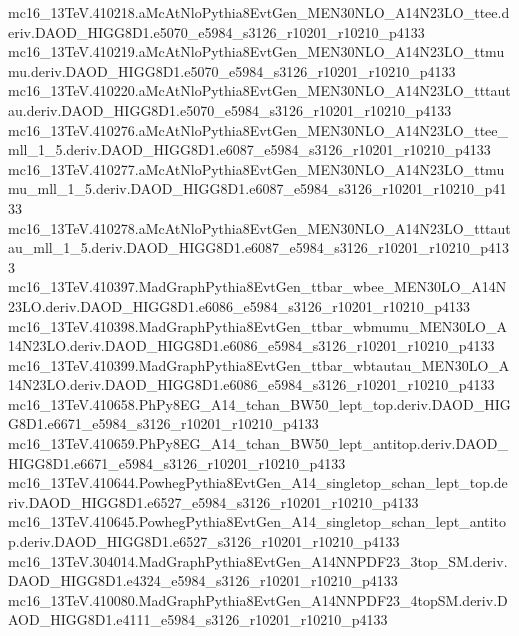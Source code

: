\begin{footnotesize}
mc16\_13TeV.410218.aMcAtNloPythia8EvtGen\_MEN30NLO\_A14N23LO\_ttee.deriv.DAOD\_HIGG8D1.e5070\_e5984\_s3126\_r10201\_r10210\_p4133 \\
mc16\_13TeV.410219.aMcAtNloPythia8EvtGen\_MEN30NLO\_A14N23LO\_ttmumu.deriv.DAOD\_HIGG8D1.e5070\_e5984\_s3126\_r10201\_r10210\_p4133 \\
mc16\_13TeV.410220.aMcAtNloPythia8EvtGen\_MEN30NLO\_A14N23LO\_tttautau.deriv.DAOD\_HIGG8D1.e5070\_e5984\_s3126\_r10201\_r10210\_p4133 \\
mc16\_13TeV.410276.aMcAtNloPythia8EvtGen\_MEN30NLO\_A14N23LO\_ttee\_mll\_1\_5.deriv.DAOD\_HIGG8D1.e6087\_e5984\_s3126\_r10201\_r10210\_p4133 \\
mc16\_13TeV.410277.aMcAtNloPythia8EvtGen\_MEN30NLO\_A14N23LO\_ttmumu\_mll\_1\_5.deriv.DAOD\_HIGG8D1.e6087\_e5984\_s3126\_r10201\_r10210\_p4133 \\
mc16\_13TeV.410278.aMcAtNloPythia8EvtGen\_MEN30NLO\_A14N23LO\_tttautau\_mll\_1\_5.deriv.DAOD\_HIGG8D1.e6087\_e5984\_s3126\_r10201\_r10210\_p4133 \\
mc16\_13TeV.410397.MadGraphPythia8EvtGen\_ttbar\_wbee\_MEN30LO\_A14N23LO.deriv.DAOD\_HIGG8D1.e6086\_e5984\_s3126\_r10201\_r10210\_p4133 \\
mc16\_13TeV.410398.MadGraphPythia8EvtGen\_ttbar\_wbmumu\_MEN30LO\_A14N23LO.deriv.DAOD\_HIGG8D1.e6086\_e5984\_s3126\_r10201\_r10210\_p4133 \\
mc16\_13TeV.410399.MadGraphPythia8EvtGen\_ttbar\_wbtautau\_MEN30LO\_A14N23LO.deriv.DAOD\_HIGG8D1.e6086\_e5984\_s3126\_r10201\_r10210\_p4133 \\
mc16\_13TeV.410658.PhPy8EG\_A14\_tchan\_BW50\_lept\_top.deriv.DAOD\_HIGG8D1.e6671\_e5984\_s3126\_r10201\_r10210\_p4133 \\
mc16\_13TeV.410659.PhPy8EG\_A14\_tchan\_BW50\_lept\_antitop.deriv.DAOD\_HIGG8D1.e6671\_e5984\_s3126\_r10201\_r10210\_p4133 \\
mc16\_13TeV.410644.PowhegPythia8EvtGen\_A14\_singletop\_schan\_lept\_top.deriv.DAOD\_HIGG8D1.e6527\_e5984\_s3126\_r10201\_r10210\_p4133 \\
mc16\_13TeV.410645.PowhegPythia8EvtGen\_A14\_singletop\_schan\_lept\_antitop.deriv.DAOD\_HIGG8D1.e6527\_s3126\_r10201\_r10210\_p4133 \\
mc16\_13TeV.304014.MadGraphPythia8EvtGen\_A14NNPDF23\_3top\_SM.deriv.DAOD\_HIGG8D1.e4324\_e5984\_s3126\_r10201\_r10210\_p4133 \\
mc16\_13TeV.410080.MadGraphPythia8EvtGen\_A14NNPDF23\_4topSM.deriv.DAOD\_HIGG8D1.e4111\_e5984\_s3126\_r10201\_r10210\_p4133 \\

\end{footnotesize}
